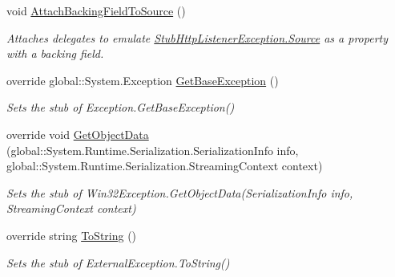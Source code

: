 \begin{DoxyCompactItemize}
void \hyperlink{class_system_1_1_net_1_1_fakes_1_1_stub_http_listener_exception_ac76efcb060073f9fad0613a9eebbba0c}{Attach\-Backing\-Field\-To\-Source} ()
\begin{DoxyCompactList}\small\item\em Attaches delegates to emulate \hyperlink{class_system_1_1_net_1_1_fakes_1_1_stub_http_listener_exception_ac5ecdd8e5f07e93ffd35b78af03da6d9}{Stub\-Http\-Listener\-Exception.\-Source} as a property with a backing field.\end{DoxyCompactList}\item 
override global\-::\-System.\-Exception \hyperlink{class_system_1_1_net_1_1_fakes_1_1_stub_http_listener_exception_ab5b25a3b10b1ce4cd57c795aac0e9045}{Get\-Base\-Exception} ()
\begin{DoxyCompactList}\small\item\em Sets the stub of Exception.\-Get\-Base\-Exception()\end{DoxyCompactList}\item 
override void \hyperlink{class_system_1_1_net_1_1_fakes_1_1_stub_http_listener_exception_a80d04348ece45ad1517a0cc329a4f037}{Get\-Object\-Data} (global\-::\-System.\-Runtime.\-Serialization.\-Serialization\-Info info, global\-::\-System.\-Runtime.\-Serialization.\-Streaming\-Context context)
\begin{DoxyCompactList}\small\item\em Sets the stub of Win32\-Exception.\-Get\-Object\-Data(\-Serialization\-Info info, Streaming\-Context context)\end{DoxyCompactList}\item 
override string \hyperlink{class_system_1_1_net_1_1_fakes_1_1_stub_http_listener_exception_a5fad15f417fd947715ba625a998a4772}{To\-String} ()
\begin{DoxyCompactList}\small\item\em Sets the stub of External\-Exception.\-To\-String()\end{DoxyCompactList}\end{DoxyCompactItemize}
